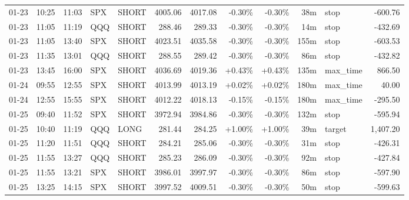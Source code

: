 \documentclass[11pt,a4paper,twoside]{article}
\begin{document}
\begin{center}
\begin{longtable}{>{\color{txtmain}}l l l l l r r r r r >{\color{txtmain}}l r}
01-23 & 10:25 & 11:03 & SPX & SHORT & 4005.06 & 4017.08 & \textcolor{lossred}{-0.30\%} & \textcolor{lossred}{-0.30\%} & 38m & stop & \textcolor{lossred}{-600.76} \\
01-23 & 11:05 & 11:19 & QQQ & SHORT & 288.46 & 289.33 & \textcolor{lossred}{-0.30\%} & \textcolor{lossred}{-0.30\%} & 14m & stop & \textcolor{lossred}{-432.69} \\
01-23 & 11:05 & 13:40 & SPX & SHORT & 4023.51 & 4035.58 & \textcolor{lossred}{-0.30\%} & \textcolor{lossred}{-0.30\%} & 155m & stop & \textcolor{lossred}{-603.53} \\
01-23 & 11:35 & 13:01 & QQQ & SHORT & 288.55 & 289.42 & \textcolor{lossred}{-0.30\%} & \textcolor{lossred}{-0.30\%} & 86m & stop & \textcolor{lossred}{-432.82} \\
01-23 & 13:45 & 16:00 & SPX & SHORT & 4036.69 & 4019.36 & \textcolor{wingreen}{+0.43\%} & \textcolor{wingreen}{+0.43\%} & 135m & max\_time & \textcolor{wingreen}{866.50} \\
01-24 & 09:55 & 12:55 & SPX & SHORT & 4013.99 & 4013.19 & \textcolor{wingreen}{+0.02\%} & \textcolor{wingreen}{+0.02\%} & 180m & max\_time & \textcolor{wingreen}{40.00} \\
01-24 & 12:55 & 15:55 & SPX & SHORT & 4012.22 & 4018.13 & \textcolor{lossred}{-0.15\%} & \textcolor{lossred}{-0.15\%} & 180m & max\_time & \textcolor{lossred}{-295.50} \\
01-25 & 09:40 & 11:52 & SPX & SHORT & 3972.94 & 3984.86 & \textcolor{lossred}{-0.30\%} & \textcolor{lossred}{-0.30\%} & 132m & stop & \textcolor{lossred}{-595.94} \\
01-25 & 10:40 & 11:19 & QQQ & LONG & 281.44 & 284.25 & \textcolor{wingreen}{+1.00\%} & \textcolor{wingreen}{+1.00\%} & 39m & target & \textcolor{wingreen}{1,407.20} \\
01-25 & 11:20 & 11:51 & QQQ & SHORT & 284.21 & 285.06 & \textcolor{lossred}{-0.30\%} & \textcolor{lossred}{-0.30\%} & 31m & stop & \textcolor{lossred}{-426.31} \\
01-25 & 11:55 & 13:27 & QQQ & SHORT & 285.23 & 286.09 & \textcolor{lossred}{-0.30\%} & \textcolor{lossred}{-0.30\%} & 92m & stop & \textcolor{lossred}{-427.84} \\
01-25 & 11:55 & 13:21 & SPX & SHORT & 3986.01 & 3997.97 & \textcolor{lossred}{-0.30\%} & \textcolor{lossred}{-0.30\%} & 86m & stop & \textcolor{lossred}{-597.90} \\
01-25 & 13:25 & 14:15 & SPX & SHORT & 3997.52 & 4009.51 & \textcolor{lossred}{-0.30\%} & \textcolor{lossred}{-0.30\%} & 50m & stop & \textcolor{lossred}{-599.63} \\

\end{longtable}
\end{center}
\end{document}
